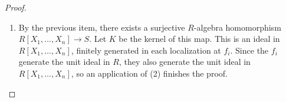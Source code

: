 \begin{proof}
\begin{enumerate}
For each $x\in X_i$, write $x=y_x/f_i^{a_x}$ with
$y_x\in S$ and $a_x\geq0$, and put $Y_i=\{y_x\mid x\in X_i\}$.
The equalities $y_x/1=f_i^{a_x}x$ and
$x=f_i^{-a_x}(y_x/1)$ show that the images of $Y_i$ generate
the same $R_{f_i}$-subalgebra as $X_i$, because both scalar factors
belong to the base ring $R_{f_i}$. Let $Y$ be the union of the
finite sets $Y_i$; it is finite.
Consider the algebra homomorphism $R[X_y]_{y \in Y} \rightarrow S$
induced by $Y$. Since it is an algebra homomorphism, the image $T$
is an $R$-submodule of the $R$-module $S$, so we can consider the
quotient module $S/T$. By assumption, this is zero if we localize
at the $f_i$, so it is zero by (1) and therefore $S$ is an
$R$-algebra of finite type.
\item By the previous item, there exists a surjective $R$-algebra
homomorphism $R[X_1, \ldots, X_n] \rightarrow S$. Let $K$ be the kernel
of this map. This is an ideal in $R[X_1, \ldots, X_n]$, finitely generated
in each localization at $f_i$. Since the $f_i$ generate the unit ideal
in $R$, they also generate the unit ideal in $R[X_1, \ldots, X_n]$, so an
application of (2) finishes the proof.
\end{enumerate}
\end{proof}